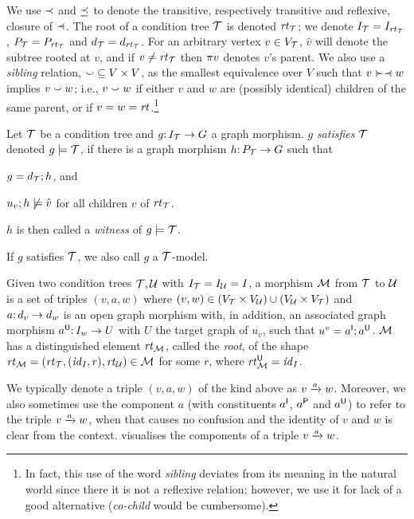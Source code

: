 We use $\ancestof$ and $\ancesteq$ to denote the transitive, respectively transitive and reflexive, closure of $\parentof$. The root of a condition tree $\cT$ is denoted $\rt\cT$; we denote $I_\cT=I_{\rt\cT}$, $P_\cT=P_{\rt\cT}$ and $d_\cT=d_{\rt\cT}$. For an arbitrary vertex $v\in V_\cT$, $\hat v$ will denote the subtree rooted at $v$, and if $v\neq\rt\cT$ then $\parent v$ denotes $v$'s parent. We also use a \emph{sibling} relation, ${\sibling}\subseteq V\times V$, as the smallest equivalence over $V$ such that $v\childof\parentof w$ implies $v\sibling w$; i.e., $v\sibling w$ if either $v$ and $w$ are (possibly identical) children of the same parent, or if $v=w=\rt{}$.\footnote{In fact, this use of the word \emph{sibling} deviates from its meaning in the natural world since there it is not a reflexive relation; however, we use it for lack of a good alternative (\emph{co-child} would be cumbersome).}

\begin{definition}[satisfaction]\label{def:satisfaction}
Let $\cT$ be a condition tree and $g\of I_\cT\to G$ a graph morphism. $g$ \emph{satisfies $\cT$} denoted $g\sat \cT$, if there is a graph morphism $h\of P_\cT\to G$ such that
\begin{inumerate}
\item $g=d_\cT;h$, and 
\item $u_v;h\nsat \hat v$ for all children $v$ of $\rt\cT$.
\end{inumerate}
$h$ is then called a \emph{witness} of $g\sat \cT$.
\end{definition}
%
If $g$ satisfies $\cT$, we also call $g$ a $\cT$-model.


\begin{definition}[morphism]\label{def:morphism}
Given two condition trees $\cT,\cU$ with $I_\cT=I_\cU=I$, a morphism $\cM$ from $\cT$ to $\cU$ is a set of triples $(v,a,w)$ where $(v,w)\in (V_\cT\times V_\cU)\cup (V_\cU\times V_\cT)$ and $a\of d_v\to d_w$ is an open graph morphism with, in addition, an associated graph morphism $a\U\of I_w\to U$ with $U$ the target graph of $u_v$, such that $u^v=a\I;a\U$. $\cM$ has a distinguished element $\rt\cM$, called the \emph{root}, of the shape $\rt\cM=(\rt\cT,(\id_I,r),\rt\cU)\in \cM$ for some $r$, where $\rt\cM\U=\id_I$.
\end{definition}
%
We typically denote a triple $(v,a,w)$ of the kind above as $\trip vaw$. Moreover, we also sometimes use the component $a$ (with constituents $a\I$, $a\P$ and $a\U$) to refer to the triple $\trip vaw$, when that causes no confusion and the identity of $v$ and $w$ is clear from the context.  visualises the components of a triple $\trip vaw$.


